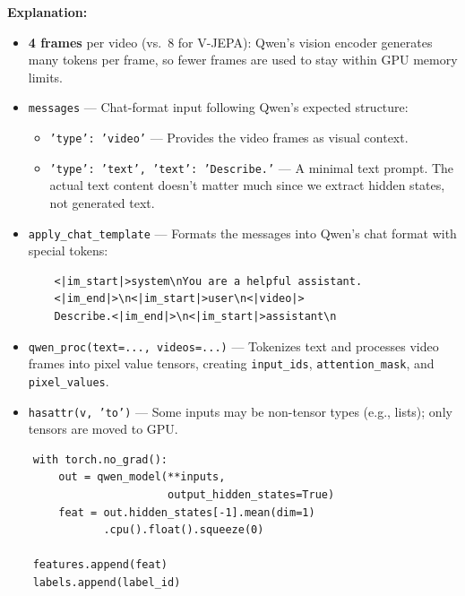 \documentclass[a4paper, 12pt]{article}
\newenvironment{explanation}{%
  \par\smallskip
  \noindent\textcolor{blue!70!black}{\textbf{Explanation:}}\\
  \noindent
}{\par\medskip}
\begin{document}
\begin{explanation}
\begin{itemize}[nosep]
  \item \textbf{4 frames} per video (vs.\ 8 for V-JEPA): Qwen's vision encoder generates many tokens per frame, so fewer frames are used to stay within GPU memory limits.
  \item \texttt{messages} --- Chat-format input following Qwen's expected structure:
  \begin{itemize}[nosep]
    \item \texttt{'type': 'video'} --- Provides the video frames as visual context.
    \item \texttt{'type': 'text', 'text': 'Describe.'} --- A minimal text prompt. The actual text content doesn't matter much since we extract hidden states, not generated text.
  \end{itemize}
  \item \texttt{apply\_chat\_template} --- Formats the messages into Qwen's chat format with special tokens:
  \begin{verbatim}
    <|im_start|>system\nYou are a helpful assistant.
    <|im_end|>\n<|im_start|>user\n<|video|>
    Describe.<|im_end|>\n<|im_start|>assistant\n
  \end{verbatim}
  \item \texttt{qwen\_proc(text=..., videos=...)} --- Tokenizes text and processes video frames into pixel value tensors, creating \texttt{input\_ids}, \texttt{attention\_mask}, and \texttt{pixel\_values}.
  \item \texttt{hasattr(v, 'to')} --- Some inputs may be non-tensor types (e.g., lists); only tensors are moved to GPU.
\end{itemize}
\end{explanation}

\begin{lstlisting}
    with torch.no_grad():
        out = qwen_model(**inputs,
                         output_hidden_states=True)
        feat = out.hidden_states[-1].mean(dim=1)
               .cpu().float().squeeze(0)

    features.append(feat)
    labels.append(label_id)
\end{lstlisting}
\end{document}

